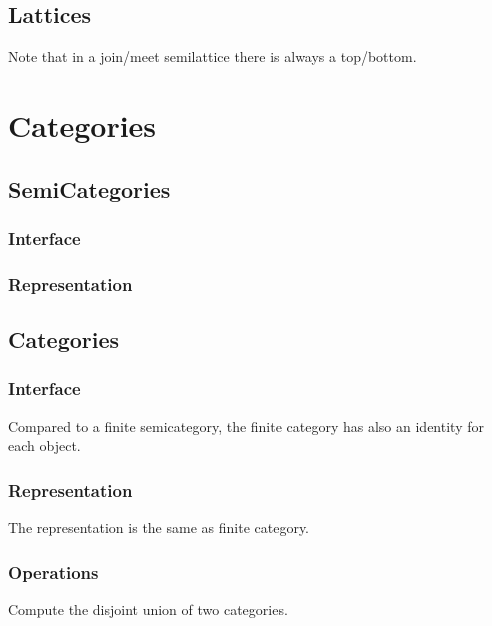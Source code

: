 \section{Lattices}





Note that in a join/meet semilattice there is always a top/bottom.


\chapter{Categories}


\section{SemiCategories}
\subsection*{Interface}

\subsection*{Representation}


\section{Categories}
\subsection*{Interface}
Compared to a finite semicategory, the finite category
has also an identity for each object.

\subsection*{Representation}

The representation is the same as finite category.

\subsection*{Operations}

\begin{exercise}
  Compute the disjoint union of two categories.

\end{exercise}


